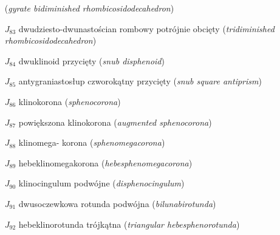 \begin{itemize}
                     (\emph{gyrate bidiminished rhombicosidodecahedron})
    \item [$J_{83}$] {dwudziesto-dwunastościan rombowy potrójnie obcięty}
                     (\emph{tridiminished rhombicosidodecahedron})
    \item [$J_{84}$] {dwuklinoid przycięty}
                     (\emph{snub disphenoid})
    \item [$J_{85}$] {antygraniastosłup czworokątny przycięty}
                     (\emph{snub square antiprism})
    \item [$J_{86}$] {klinokorona}
                     (\emph{sphenocorona})
    \item [$J_{87}$] {powiększona klinokorona}
                     (\emph{augmented sphenocorona})
    \item [$J_{88}$] {klinomega- korona}
                     (\emph{sphenomegacorona})
    \item [$J_{89}$] {hebeklinomegakorona}
                     (\emph{hebesphenomegacorona})
    \item [$J_{90}$] {klinocingulum podwójne}
                     (\emph{disphenocingulum})
    \item [$J_{91}$] {dwusoczewkowa rotunda podwójna}
                     (\emph{bilunabirotunda})
    \item [$J_{92}$] {hebeklinorotunda trójkątna}
                     (\emph{triangular hebesphenorotunda})
\end{itemize}